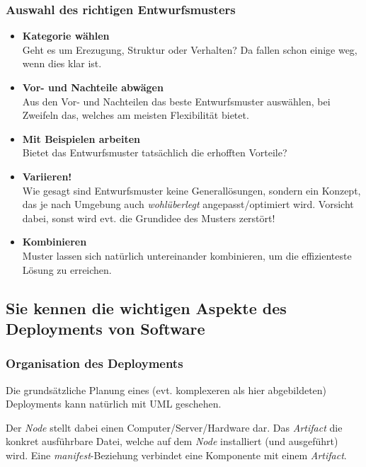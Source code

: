 \subsubsection{Auswahl des richtigen Entwurfsmusters}
\begin{itemize}
  \item \textbf{Kategorie wählen} \\
  Geht es um Erezugung, Struktur oder Verhalten? Da fallen schon einige weg, wenn dies klar ist.
  \item \textbf{Vor- und Nachteile abwägen} \\
  Aus den Vor- und Nachteilen das beste Entwurfsmuster auswählen, bei Zweifeln das, welches am meisten Flexibilität bietet.
  \item \textbf{Mit Beispielen arbeiten} \\
  Bietet das Entwurfsmuster tatsächlich die erhofften Vorteile?
  \item \textbf{Variieren!} \\
  Wie gesagt sind Entwurfsmuster keine Generallösungen, sondern ein Konzept, das je nach Umgebung auch \emph{wohlüberlegt} angepasst/optimiert wird. Vorsicht dabei, sonst wird evt. die Grundidee des Musters zerstört!
  \item \textbf{Kombinieren} \\
  Muster lassen sich natürlich untereinander kombinieren, um die effizienteste Lösung zu erreichen. 
\end{itemize}

\subsection{Sie kennen die wichtigen Aspekte des Deployments von Software}

\subsubsection{Organisation des Deployments}
Die grundsätzliche Planung eines (evt. komplexeren als hier abgebildeten) Deployments kann natürlich mit UML geschehen.


Der \emph{Node} stellt dabei einen Computer/Server/Hardware dar. Das \emph{Artifact} die konkret ausführbare Datei, welche auf dem \emph{Node} installiert (und ausgeführt) wird. Eine \emph{manifest}-Beziehung verbindet eine Komponente mit einem \emph{Artifact}.

